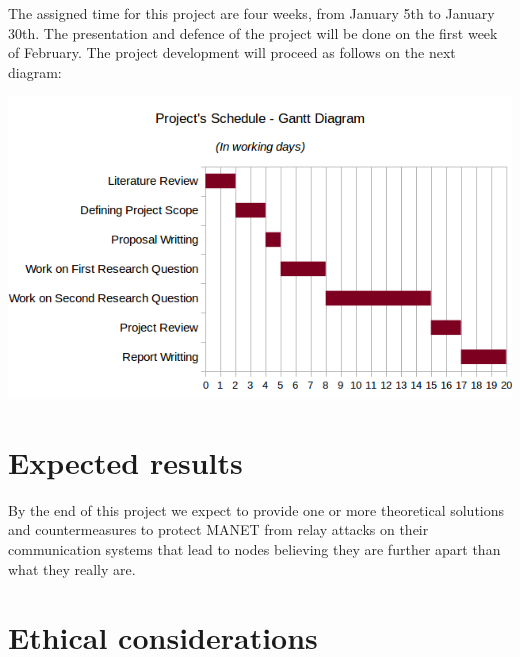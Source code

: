 \documentclass{article}
\begin{document}
The assigned time for this project are four weeks, from January 5th to January 30th. The presentation and defence of the project will be done on the first week of February. The project development will proceed as follows on the next diagram:

\begin{center}
\includegraphics[scale=0.7]{images/gantt.png}\\[1cm]
\end{center}

\section{Expected results}

By the end of this project we expect to provide one or more theoretical solutions and countermeasures to protect MANET from relay attacks on their communication systems that lead to nodes believing they are further apart than what they really are.

\section{Ethical considerations}



\printbibliography
\end{document}
